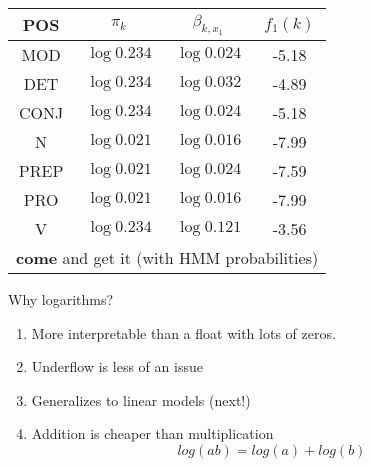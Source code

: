 \documentclass[compress]{beamer}
\begin{document}
\begin{frame}

\begin{center}
\begin{tabular}{|c|c|c|c|}
\hline
POS  & $\pi_k$ & $\beta_{k,x_1}$&  $ f_1(k)$ \\
\hline
MOD  & $\log 0.234$ & $\log 0.024$ & -5.18 \\
DET   & $\log 0.234$ & $\log 0.032$ & -4.89 \\
CONJ  & $\log 0.234$ & $\log 0.024$ & -5.18\\
N   & $\log 0.021$ & $\log 0.016$ & -7.99 \\
PREP & $\log 0.021$ & $\log 0.024$ & -7.59 \\
PRO  & $\log 0.021$ & $\log 0.016$ & -7.99 \\
V  & $\log 0.234$ & $\log 0.121$ & -3.56 \\
\hline
\multicolumn{4}{c}{{\bf come} and get it (with HMM probabilities)}
\end{tabular}

\end{center}

Why logarithms?
\begin{enumerate}
\item More interpretable than a float with lots of zeros.
\item Underflow is less of an issue
\item Generalizes to linear models (next!)
\item Addition is cheaper than multiplication
  \begin{equation}
    log(ab) = log(a) + log(b)
  \end{equation}
\end{enumerate}

\end{frame}
\end{document}
